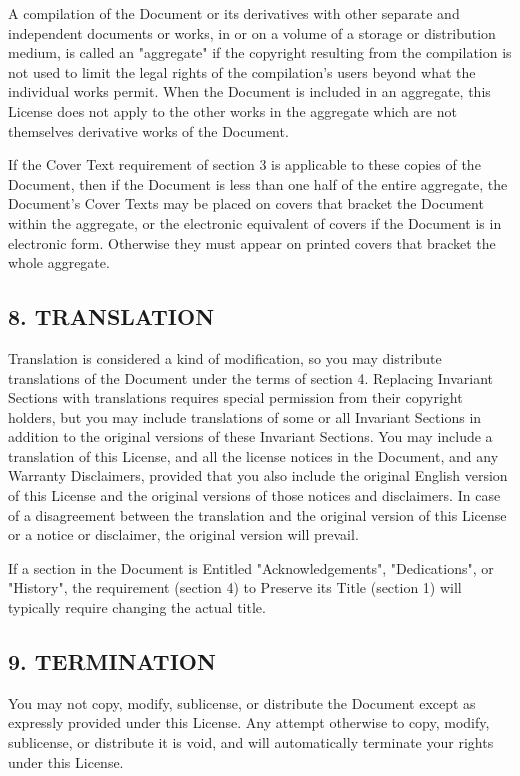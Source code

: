 A compilation of the Document or its derivatives with other separate and independent documents or works, in or on a volume of a storage or distribution medium, 
is called an "aggregate" if the copyright resulting from the compilation is not used to limit the legal rights of the compilation's users beyond what the individual 
works permit. When the Document is included in an aggregate, this License does not apply to the other works in the aggregate which are not themselves derivative works 
of the Document.

If the Cover Text requirement of section 3 is applicable to these copies of the Document, then if the Document is less than one half of the entire aggregate, 
the Document's Cover Texts may be placed on covers that bracket the Document within the aggregate, or the electronic equivalent of covers if the Document is in 
electronic form. Otherwise they must appear on printed covers that bracket the whole aggregate.


\subsection*{8. TRANSLATION}

Translation is considered a kind of modification, so you may distribute translations of the Document under the terms of section 4. Replacing Invariant Sections 
with translations requires special permission from their copyright holders, but you may include translations of some or all Invariant Sections in addition to 
the original versions of these Invariant Sections. You may include a translation of this License, and all the license notices in the Document, and any 
Warranty Disclaimers, provided that you also include the original English version of this License and the original versions of those notices and disclaimers. 
In case of a disagreement between the translation and the original version of this License or a notice or disclaimer, the original version will prevail.

If a section in the Document is Entitled "Acknowledgements", "Dedications", or "History", the requirement (section 4) to Preserve its Title (section 1) will 
typically require changing the actual title.


\subsection*{9. TERMINATION}

You may not copy, modify, sublicense, or distribute the Document except as expressly provided under this License. Any attempt otherwise to copy, 
modify, sublicense, or distribute it is void, and will automatically terminate your rights under this License.

